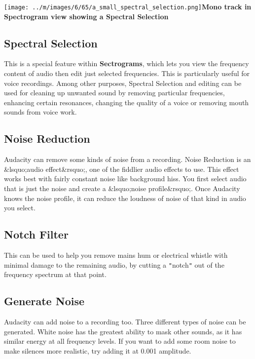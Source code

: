 \documentclass[twocolumn]{book}
\begin{document}
\texttt{[image: ../m/images/6/65/a\_small\_spectral\_selection.png]}\textbf{Mono track in Spectrogram view showing a Spectral Selection}

\subsection{Spectral Selection}


This is a special feature within \textbf{Sectrograms}, which lets you view the frequency content of audio then edit just selected frequencies.  This is particularly useful for voice recordings.  Among other purposes, Spectral Selection and editing can be used for cleaning up unwanted sound by removing particular frequencies, enhancing certain resonances, changing the quality of a voice or removing mouth sounds from voice work.

\subsection{Noise Reduction}


Audacity can remove some kinds of noise from a recording.  Noise Reduction is an \&lsquo;audio effect\&rsquo;, one of the fiddlier audio effects to use.  This effect works best with fairly constant noise like background hiss.  You first select audio that is just the noise and create a \&lsquo;noise profile\&rsquo;.  Once Audacity knows the noise profile, it can reduce the loudness of noise of that kind in audio you select. 

\subsection{Notch Filter}


This can be used to help you remove mains hum or electrical whistle with minimal damage to the remaining audio, by cutting a \texttt{{}"{}}notch\texttt{{}"{}} out of the frequency spectrum at that point.

\subsection{Generate Noise}


Audacity can add noise to a recording too. Three different types of noise can be generated. White noise has the greatest ability to mask other sounds, as it has similar energy at all frequency levels. If you want to add some room noise to make silences more realistic, try adding it at 0.001 amplitude.
\end{document}
